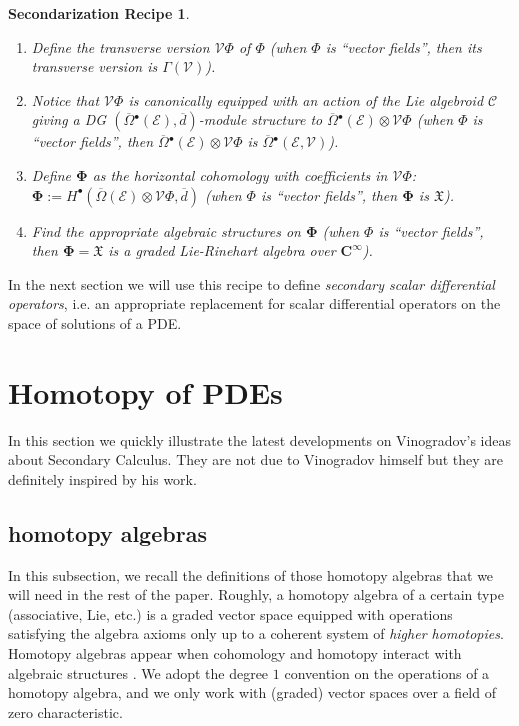 \documentclass{conm-p-l}
\newtheorem*{recipe}{Secondarization Recipe}
\theoremstyle{definition}
\theoremstyle{remark}
\numberwithin{equation}{section}
\begin{document}
\begin{recipe} \quad
\begin{enumerate}
\item Define the \emph{transverse version} $\mathscr V \Phi$ of $\Phi$ (when $\Phi$ is ``vector fields'', then its transverse version is $\Gamma (\mathscr V)$).
\item Notice that $\mathscr V \Phi$ is canonically equipped with an action of the Lie algebroid $\mathscr C$ giving a DG $(\overline \Omega{}^\bullet(\mathscr E) , \overline d)$-module structure to $\overline \Omega{}^\bullet(\mathscr E) \otimes \mathscr V \Phi$ (when $\Phi$ is ``vector fields'', then $\overline \Omega{}^\bullet(\mathscr E) \otimes \mathscr V \Phi$ is $\overline \Omega{}^\bullet (\mathscr E, \mathscr V)$).
\item Define $\boldsymbol \Phi$ as the horizontal cohomology with coefficients in $\mathscr V \Phi$: $\boldsymbol \Phi := H^\bullet (\overline \Omega(\mathscr E) \otimes \mathscr V \Phi, \overline d)$ (when $\Phi$ is ``vector fields'', then $\boldsymbol \Phi$ is $\boldsymbol{\mathfrak X}$).
\item Find the appropriate algebraic structures on $\boldsymbol \Phi$ (when $\Phi$ is ``vector fields'', then $\boldsymbol \Phi = \boldsymbol{\mathfrak X}$ is a graded Lie-Rinehart algebra over $\boldsymbol C^\infty$).
\end{enumerate}
\end{recipe}

In the next section we will use this recipe to define \emph{secondary scalar differential operators}, i.e.{} an appropriate replacement for scalar differential operators on the space of solutions of a PDE.

\section{Homotopy of PDEs}\label{Sec:Homot}

In this section we quickly illustrate the latest developments on Vinogradov's ideas about Secondary Calculus. They are not due to Vinogradov himself but they are definitely inspired by his work.

\subsection{homotopy algebras}

In this subsection, we recall the definitions of those homotopy algebras that we will need in the rest of the paper. Roughly, a homotopy algebra of a certain type (associative, Lie, etc.) is a graded vector space equipped with operations satisfying the algebra axioms only up to a coherent system of \emph{higher homotopies}. Homotopy algebras appear when cohomology and homotopy interact with algebraic structures \cite{lv12, v14}. We adopt the degree $1$ convention on the operations of a homotopy algebra, and we only work with (graded) vector spaces over a field of zero characteristic.
\end{document}

